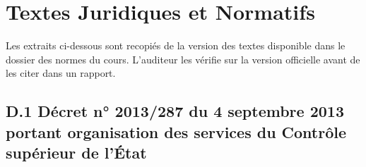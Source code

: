 
\chapter{Textes Juridiques et Normatifs}
\label{ann:textes}

Les extraits ci-dessous sont recopiés de la version des textes disponible
dans le dossier des normes du cours. L'auditeur les vérifie sur la version
officielle avant de les citer dans un rapport.

\section*{D.1 Décret n° 2013/287 du 4 septembre 2013 portant organisation
des services du Contrôle supérieur de l'État}


